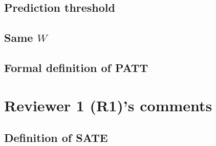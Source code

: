 \documentclass[hidelinks,12pt,letterpaper]{article}
\begin{document}
\subsection{Prediction threshold}

\subsection{Same $W$}


\subsection{Formal definition of PATT}

\section{Reviewer 1 (R1)'s comments}

\subsection{Definition of SATE} \label{SATE-def}
\end{document}

